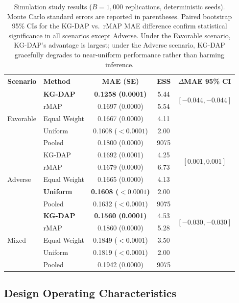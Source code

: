 \documentclass[12pt]{article}
\begin{document}
\begin{table}[t]
\centering
\caption{Simulation study results ($B = 1{,}000$ replications, deterministic seeds). Monte Carlo standard errors are reported in parentheses. Paired bootstrap 95\% CIs for the KG-DAP vs.\ rMAP MAE difference confirm statistical significance in all scenarios except Adverse. Under the Favorable scenario, KG-DAP's advantage is largest; under the Adverse scenario, KG-DAP gracefully degrades to near-uniform performance rather than harming inference.}
\label{tab:simulation}
\begin{tabular}{llccc}
\toprule
Scenario & Method & MAE (SE) & ESS & $\Delta$MAE 95\% CI \\
\midrule
\multirow{5}{*}{Favorable}
& \textbf{KG-DAP} & \textbf{0.1258 (0.0001)} & 5.44 & \multirow{2}{*}{$[-0.044, -0.044]$} \\
& rMAP             & 0.1697 (0.0000)           & 5.54 & \\
& Equal Weight     & 0.1667 (0.0000)           & 4.11 & \\
& Uniform          & 0.1608 ($< 0.0001$)       & 2.00 & \\
& Pooled           & 0.1800 (0.0000)           & 9075 & \\
\midrule
\multirow{5}{*}{Adverse}
& KG-DAP           & 0.1692 (0.0001) & 4.25 & \multirow{2}{*}{$[0.001, 0.001]$} \\
& rMAP             & 0.1679 (0.0000) & 6.73 & \\
& Equal Weight     & 0.1665 (0.0000) & 4.13 & \\
& \textbf{Uniform} & \textbf{0.1608 ($< 0.0001$)} & 2.00 & \\
& Pooled           & 0.1632 ($< 0.0001$) & 9075 & \\
\midrule
\multirow{5}{*}{Mixed}
& \textbf{KG-DAP} & \textbf{0.1560 (0.0001)} & 4.53 & \multirow{2}{*}{$[-0.030, -0.030]$} \\
& rMAP             & 0.1860 (0.0000)           & 5.28 & \\
& Equal Weight     & 0.1849 ($< 0.0001$)      & 3.50 & \\
& Uniform          & 0.1819 ($< 0.0001$)      & 2.00 & \\
& Pooled           & 0.1942 (0.0000)           & 9075 & \\
\bottomrule
\end{tabular}
\end{table}

\subsection{Design Operating Characteristics}
\label{sec:design_oc}
\end{document}
